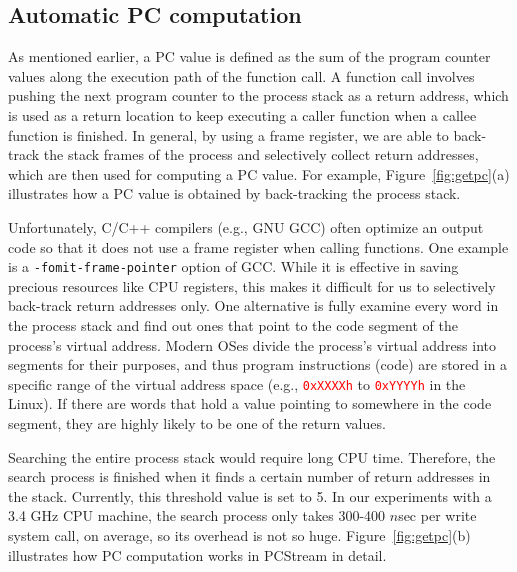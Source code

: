 \vspace{-5pt}
\subsection{Automatic PC computation}
As mentioned earlier, a PC value is defined as the sum of the program counter
values along the execution path of the function call.  A function call involves
pushing the next program counter to the process stack as a return address,
which  is used as a return location to keep executing a caller function when a
callee function is finished.  In general, by using a frame register, we are
able to back-track the stack frames of the process and selectively collect
return addresses, which are then used for computing a PC value. For example,
Figure~\ref{fig:getpc}(a) illustrates how a PC value is obtained by
back-tracking the process stack.

Unfortunately, C/C++ compilers (e.g., GNU GCC) often optimize an output code so
that it does not use a frame register when calling functions.  One example is a
{\tt -fomit-frame-pointer} option of GCC. While it is effective in saving
precious resources like CPU registers, this makes it difficult for us to
selectively back-track return addresses only. One alternative is fully examine
every word in the process stack and find out ones that point to the code
segment of the process's virtual address.  Modern OSes divide the process's
virtual address into segments for their purposes, and thus program instructions
(code) are stored in a specific range of the virtual address space (e.g.,
\textcolor{red}{\texttt{0xXXXXh}} to \textcolor{red}{\texttt{0xYYYYh}} in the
Linux).  If there are words that hold a value pointing to somewhere in the code
segment, they are highly likely to be one of the return values.  

Searching the entire process stack would require long CPU time. Therefore, the
search process is finished when it finds a certain number of return addresses
in the stack. Currently, this threshold value is set to 5.  In our experiments
with a 3.4 GHz CPU machine, the search process only takes 300-400 $n$sec per
write system call, on average, so its overhead is not so huge.
Figure~\ref{fig:getpc}(b) illustrates how PC computation works in PCStream in
detail.

